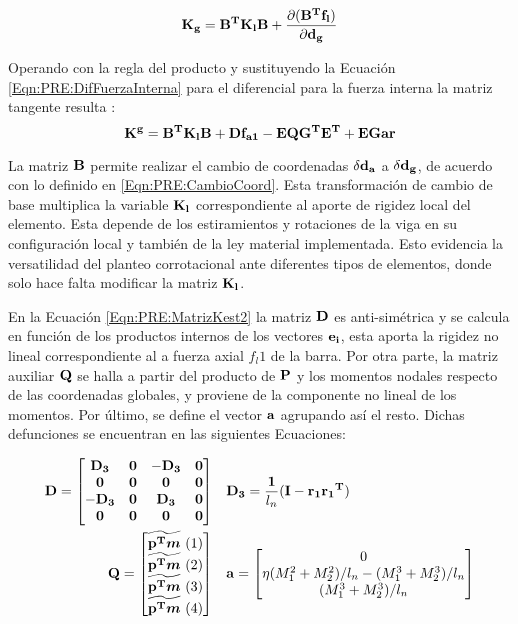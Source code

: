 \begin{equation}\label{Eqn:PRE:MatrizKest1}
\bf{K_g}=\bf{B}^T\bf{K_l}\bf{B}+\frac{\partial (\bf{B}^T\bf{f}_l)}{\partial \bf{d}_g}
\end{equation}

Operando con la regla del producto y sustituyendo la Ecuación \eqref{Eqn:PRE:DifFuerzaInterna} para el diferencial para la fuerza interna la matriz tangente resulta : 
\begin{equation} \label{Eqn:PRE:MatrizKest2}
	\bf{K}^g=\bf{B}^T\bf{K_l}\bf{B}+\bf{D} f_{a1}-\bf{E}\bf{Q}\bf{G^T}\bf{E^T} +\bf{EGar}
\end{equation}


La matriz $\bf{B}$ permite realizar el cambio de coordenadas $\delta \bf{d_a}$ a  $\delta \bf{d_g}$, de acuerdo con lo definido en \eqref{Eqn:PRE:CambioCoord}. Esta transformación de cambio de base multiplica la variable $\bf{K_l}$ correspondiente al aporte de rigidez local del elemento. Esta depende de los estiramientos y rotaciones de la viga en su configuración local y también de la ley material implementada. Esto evidencia la versatilidad del planteo corrotacional ante diferentes tipos de elementos, donde solo hace falta modificar la matriz $\bf{K_l}$.  


En la Ecuación \eqref{Eqn:PRE:MatrizKest2} la matriz  $\bf{D}$ es anti-simétrica y se calcula en función de los productos internos de los vectores $\bf{e_i}$, esta aporta la rigidez no lineal correspondiente al a fuerza axial $f_l1$ de la barra. Por otra parte, la matriz auxiliar $\bf{Q}$ se halla a partir del producto de $\bf{P}$ y los momentos nodales respecto de las coordenadas globales, y proviene de la componente no lineal de los momentos. Por último, se define el vector $\bf{a}$ agrupando así el resto. Dichas defunciones se encuentran en las siguientes Ecuaciones:

\begin{eqnarray}
	\label{Eqn:PRE:DefD}
		\bf{D}=\begin{bmatrix}
		\bf{D_3}& \bf{0}   & -\bf{D_3}   & \bf{0} \\ 
		\bf{0}  & \bf{0} & \bf{0}   & \bf{0}\\ 
		-\bf{D_3}  & \bf{0}   & \bf{D_3} & \bf{0} \\ 
		\bf{0}  & \bf{0}   & \bf{0}   & \bf{0}
	\end{bmatrix}&~~~\bf{D_3}=\frac{1}{\text{$l_n$}}(\bf{I}-\bf{r_1}\bf{r_1}^T)\\
    \label{Eqn:PRE:DefQ}
	\bf{Q}=\begin{bmatrix}
		\widetilde{\bf{p}^T\boldsymbol{m}} ~(1)\\ 
		\widetilde{\bf{p}^T\boldsymbol{m}} ~(2)\\ 
		\widetilde{\bf{p}^T\boldsymbol{m}} ~(3)\\ 
		\widetilde{\bf{p}^T\boldsymbol{m}} ~(4)
	\end{bmatrix}&~~~\bf{a} =\begin{bmatrix}
	0\\ 
	\eta(M_1^2+M_2^2)/l_n-(M_1^3+M_2^3)/l_n\\ 
	(M_1^3+M_2^3)/l_n
\end{bmatrix}
\end{eqnarray}



